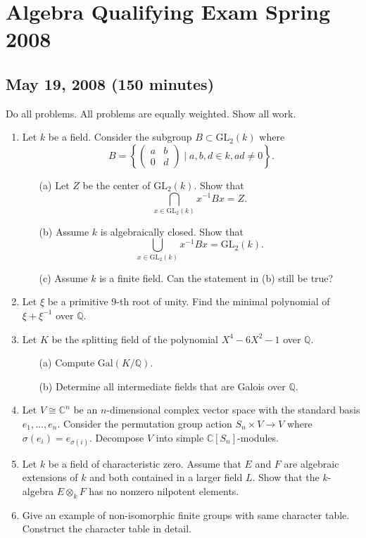 \documentclass{article}
\begin{document}
\section*{Algebra Qualifying Exam Spring 2008}
\subsection*{May 19, 2008 (150 minutes)}

Do all problems. All problems are equally weighted. Show all work.

\begin{enumerate}
    \item Let \(k\) be a field. Consider the subgroup \(B \subset \text{GL}_2(k)\) where
    \[B = \left\{ \begin{pmatrix} a & b \\ 0 & d \end{pmatrix} \mid a, b, d \in k, ad \neq 0 \right\}.\]
    \begin{itemize}
        \item[(a)] Let \(Z\) be the center of \(\text{GL}_2(k)\). Show that
        \[\bigcap_{x \in \text{GL}_2(k)} x^{-1} Bx = Z.\]
        \item[(b)] Assume \(k\) is algebraically closed. Show that
        \[\bigcup_{x \in \text{GL}_2(k)} x^{-1} Bx = \text{GL}_2(k).\]
        \item[(c)] Assume \(k\) is a finite field. Can the statement in (b) still be true?
    \end{itemize}

    \item Let \(\xi\) be a primitive 9-th root of unity. Find the minimal polynomial of \(\xi + \xi^{-1}\) over \(\mathbb{Q}\).

    \item Let \(K\) be the splitting field of the polynomial \(X^4 - 6X^2 - 1\) over \(\mathbb{Q}\).
    \begin{itemize}
        \item[(a)] Compute \(\text{Gal}(K/\mathbb{Q})\).
        \item[(b)] Determine all intermediate fields that are Galois over \(\mathbb{Q}\).
    \end{itemize}

    \item Let \(V \cong \mathbb{C}^n\) be an \(n\)-dimensional complex vector space with the standard basis \(e_1, \ldots, e_n\). Consider the permutation group action \(S_n \times V \to V\) where \(\sigma(e_i) = e_{\sigma(i)}\). Decompose \(V\) into simple \(\mathbb{C}[S_n]\)-modules.

    \item Let \(k\) be a field of characteristic zero. Assume that \(E\) and \(F\) are algebraic extensions of \(k\) and both contained in a larger field \(L\). Show that the \(k\)-algebra \(E \otimes_k F\) has no nonzero nilpotent elements.

    \item Give an example of non-isomorphic finite groups with same character table. Construct the character table in detail.
\end{enumerate}
\end{document}
